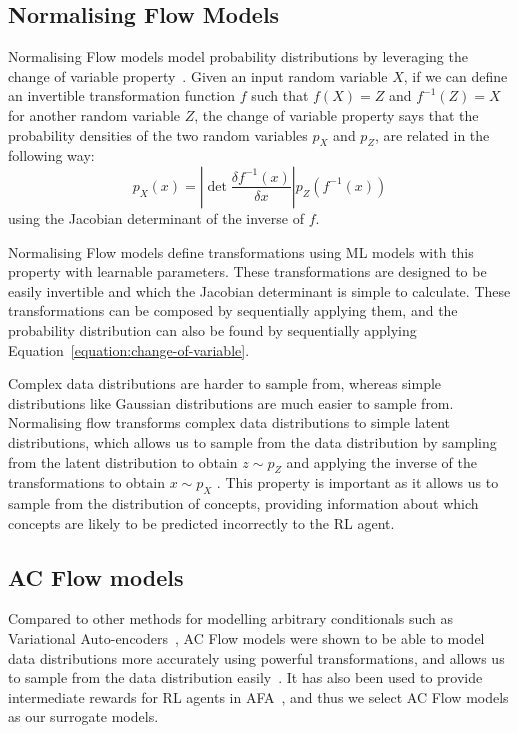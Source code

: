 \subsection{Normalising Flow Models}
Normalising Flow models model probability distributions by leveraging the change of variable property~\cite{normalizing-flows}.
Given an input random variable $X$,
if we can define an invertible transformation function $f$ such that
$f(X) = Z$ and $f^{-1}(Z) = X$ for another random variable $Z$,
the change of variable property says that 
the probability densities of the two random variables $p_X$ and $p_Z$,
are related in the following way:
\begin{equation}\label{equation:change-of-variable}
p_X(x) = \left | \mathop{\mathrm{det}} \frac{\delta  f^{-1}(x)}{\delta x}
\right | p_Z(f^{-1}(x))
\end{equation}
using the Jacobian determinant of the inverse of $f$.

Normalising Flow models define transformations
using ML models with this property with learnable parameters.
These transformations are designed to be easily invertible
and which the Jacobian determinant is simple to calculate.
These transformations can be composed by sequentially applying them,
and the probability distribution can also be found by sequentially
applying Equation~\ref{equation:change-of-variable}. 

Complex data distributions are harder to sample from, whereas simple distributions like Gaussian distributions are much easier to sample from.
Normalising flow transforms complex data distributions to simple latent distributions, which allows us to sample from the data distribution by sampling from the latent distribution to obtain
$z \sim p_Z$ and applying the inverse of the transformations to obtain $x \sim p_X$ . This property is important
as it allows us to sample from the distribution
of concepts, providing information about which concepts are likely to be predicted incorrectly to the RL agent.

\subsection{AC Flow models}
Compared to other methods for modelling
arbitrary conditionals such as Variational Auto-encoders~\cite{vae},
AC Flow models were shown to be able to 
model data distributions more accurately using powerful transformations, 
and allows us to sample from 
the data distribution easily~\cite{acflow}. 
It has also been used to provide intermediate rewards for RL agents in AFA~\cite{gsmrl},
and thus we select AC Flow models as our surrogate models.

